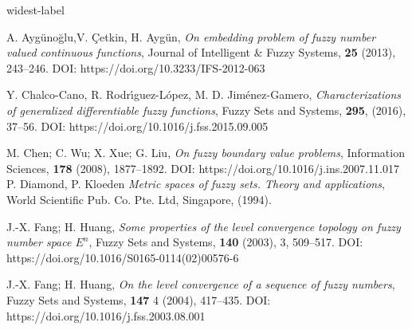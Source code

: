\documentclass{amsart}
\begin{document}



\begin{thebibliography}{widest-label}





A. Ayg\"uno\u{g}lu,V. \c{C}etkin, H. Ayg\"un,
\textit{On embedding problem of fuzzy number valued continuous functions},
Journal of Intelligent \& Fuzzy Systems, \textbf{25} (2013),  243--246.
DOI: https://doi.org/10.3233/IFS-2012-063



Y. Chalco-Cano, R. Rodr\'{\i}guez-L\'{o}pez, M. D. Jim\'{e}nez-Gamero,
\textit{Characterizations of generalized differentiable fuzzy functions},
Fuzzy Sets and Systems, \textbf{295}, (2016), 37--56.
DOI: https://doi.org/10.1016/j.fss.2015.09.005


 M. Chen; C. Wu; X. Xue; G. Liu,
\textit{On fuzzy boundary value problems},
Information Sciences, \textbf{178} (2008), 1877--1892.
DOI: https://doi.org/10.1016/j.ins.2007.11.017
 P. Diamond, P. Kloeden \textit{Metric spaces of fuzzy sets. Theory and applications}, World Scientific Pub. Co. Pte. Ltd, Singapore, (1994).


J.-X. Fang; H. Huang,
\textit{Some properties of the level convergence topology on fuzzy number space $E^n$},
Fuzzy Sets and Systems, \textbf{140} (2003),  3,  509--517.
DOI: https://doi.org/10.1016/S0165-0114(02)00576-6

 J.-X. Fang; H. Huang,
\textit{On the level convergence of a sequence of fuzzy numbers}, Fuzzy Sets and Systems, {\bf 147} 4 (2004),
417--435.
DOI: https://doi.org/10.1016/j.fss.2003.08.001


\end{thebibliography}
\end{document}
